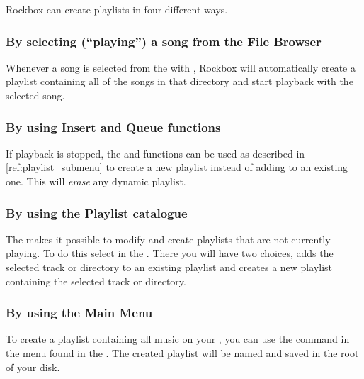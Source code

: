 Rockbox can create playlists in four different ways.

\subsubsection{By selecting (``playing'') a song from the File Browser}
Whenever a song is selected from the  with
\ActionTreeEnter, Rockbox will automatically create a playlist containing
all of the songs in that directory and start playback with the selected
song.


\subsubsection{By using Insert and Queue functions}
If playback is stopped, the  and  functions
can be used as described in \ref{ref:playlist_submenu}
to create a new playlist instead of adding to an existing one.
This will \emph{erase} any dynamic playlist.

\subsubsection{\label{ref:playlist_catalogue}By using the Playlist catalogue}
The  makes it possible to modify and create
playlists that are not currently playing. To do this select  in the . There you will have two choices,
 adds the selected track or directory to an existing
playlist and  creates a new playlist containing
the selected track or directory.


\subsubsection{By using the Main Menu}
To create a playlist containing all music on your \dap{}, you can use the
 command in the  menu found
in the . The created playlist will be named
 and saved in the root of your \daps{} disk.

